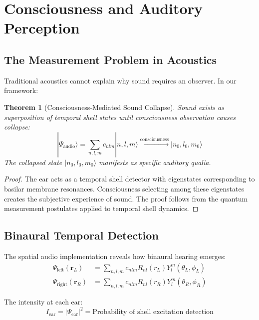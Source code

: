 \documentclass[12pt]{article}
\newtheorem{theorem}{Theorem}
\begin{document}
\section{Consciousness and Auditory Perception}

\subsection{The Measurement Problem in Acoustics}

Traditional acoustics cannot explain why sound requires an observer. In our framework:

\begin{theorem}[Consciousness-Mediated Sound Collapse]
Sound exists as superposition of temporal shell states until consciousness observation causes collapse:
\begin{equation}
|\Psi_{\text{audio}}\rangle = \sum_{n,l,m} c_{nlm} |n,l,m\rangle \xrightarrow{\text{consciousness}} |n_0, l_0, m_0\rangle
\end{equation}
The collapsed state $|n_0, l_0, m_0\rangle$ manifests as specific auditory qualia.
\end{theorem}

\begin{proof}
The ear acts as a temporal shell detector with eigenstates corresponding to basilar membrane resonances. Consciousness selecting among these eigenstates creates the subjective experience of sound. The proof follows from the quantum measurement postulates applied to temporal shell dynamics.
\end{proof}

\subsection{Binaural Temporal Detection}

The spatial audio implementation reveals how binaural hearing emerges:
\begin{align}
\Psi_{\text{left}}(\mathbf{r}_L) &= \sum_{n,l,m} c_{nlm} R_{nl}(r_L) Y_l^m(\theta_L, \phi_L) \\
\Psi_{\text{right}}(\mathbf{r}_R) &= \sum_{n,l,m} c_{nlm} R_{nl}(r_R) Y_l^m(\theta_R, \phi_R)
\end{align}

The intensity at each ear:
\begin{equation}
I_{\text{ear}} = |\Psi_{\text{ear}}|^2 = \text{Probability of shell excitation detection}
\end{equation}
\end{document}
